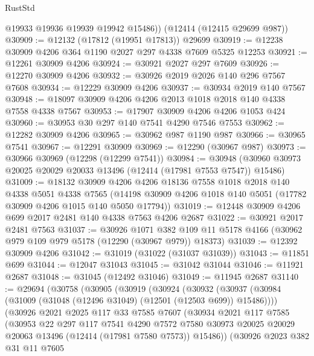 \begin{lexlean}{RustStd}
\begin{coremodule}
        @19933
        @19936
        @19939
        @19942
        @15486))
    (@12414 (@12415 @29699 @987))
@30909 := @12132 (@17812 (@19951 @17813)) @29699
@30919 := @12238 @30909 @4206 @364 @1190 @2027 @297 @4338 @7609 @5325 @12253
@30921 := @12261 @30909 @4206
@30924 := @30921 @2027 @297 @7609
@30926 := @12270 @30909 @4206
@30932 := @30926 @2019 @2026 @140 @296 @7567 @7608
@30934 := @12229 @30909 @4206
@30937 := @30934 @2019 @140 @7567
@30948 := @18097 @30909 @4206 @4206 @2013 @1018 @2018 @140 @4338 @7558 @4338 @7567
@30953 := @17907 @30909 @4206 @4206 @1053 @424
@30960 := @30953 @30 @297 @140 @7541 @4290 @7546 @7553
@30962 := @12282 @30909 @4206
@30965 := @30962 @987 @1190 @987
@30966 := @30965 @7541
@30967 := @12291 @30909
@30969 := @12290 (@30967 @987)
@30973 := @30966 @30969 (@12298 (@12299 @7541))
@30984 := @30948 (@30960 @30973 @20025 @20029 @20033 @13496 (@12414 (@17981 @7553 @7547)) @15486)
@31009 := @18132
    @30909
    @4206
    @4206
    @18136
    @7558
    @1018
    @2018
    @140
    @4338
    @5051
    @4338
    @7565
    (@14198 @30909 @4206 @1018 @140 @5051 (@17782 @30909 @4206 @1015 @140 @5050 @17794))
@31019 := @12448 @30909 @4206 @699 @2017 @2481 @140 @4338 @7563 @4206 @2687
@31022 := @30921 @2017 @2481 @7563
@31037 := @30926
    @1071
    @382
    @109
    @11
    @5178
    @4166
    (@30962 @979 @109 @979 @5178 (@12290 (@30967 @979)) @18373)
@31039 := @12392 @30909 @4206
@31042 := @31019 (@31022 (@31037 @31039))
@31043 := @11851 @699
@31044 := @12047 @31043
@31045 := @31042 @31044
@31046 := @11921 @2687
@31048 := @31045 (@12492 @31046)
@31049 := @11945 @2687
@31140 := @29694
    (@30758
      (@30905
        (@30919
          (@30924
            (@30932
              (@30937 (@30984 (@31009 (@31048 (@12496 @31049) (@12501 (@12503 @699)) @15486))))
              (@30926
                @2021
                @2025
                @117
                @33
                @7585
                @7607
                (@30934
                  @2021
                  @117
                  @7585
                  (@30953
                    @22
                    @297
                    @117
                    @7541
                    @4290
                    @7572
                    @7580
                    @30973
                    @20025
                    @20029
                    @20063
                    @13496
                    (@12414 (@17981 @7580 @7573))
                    @15486))
                (@30926
                  @2023
                  @382
                  @31
                  @11
                  @7605

\end{coremodule}
\end{lexlean}

